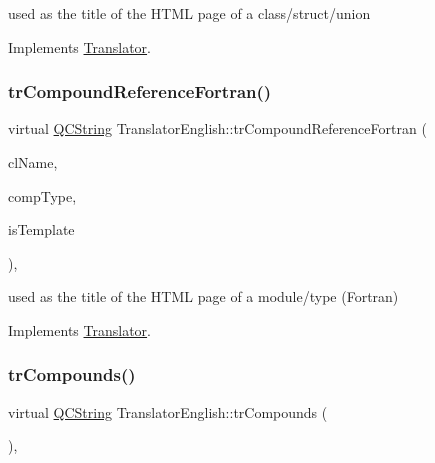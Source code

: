 used as the title of the H\+T\+ML page of a class/struct/union 

Implements \mbox{\hyperlink{class_translator}{Translator}}.

\mbox{\label{class_translator_english_a2f3045ecf95c13d25874ae6ea35d574e}} 
\subsubsection{\texorpdfstring{trCompoundReferenceFortran()}{trCompoundReferenceFortran()}}
{\footnotesize\ttfamily virtual \mbox{\hyperlink{class_q_c_string}{Q\+C\+String}} Translator\+English\+::tr\+Compound\+Reference\+Fortran (\begin{DoxyParamCaption}\item[{const char $\ast$}]{cl\+Name,  }\item[{\mbox{\hyperlink{class_class_def_ae70cf86d35fe954a94c566fbcfc87939}{Class\+Def\+::\+Compound\+Type}}}]{comp\+Type,  }\item[{bool}]{is\+Template }\end{DoxyParamCaption})\hspace{0.3cm}{\ttfamily [inline]}, {\ttfamily [virtual]}}

used as the title of the H\+T\+ML page of a module/type (Fortran) 

Implements \mbox{\hyperlink{class_translator}{Translator}}.

\mbox{\label{class_translator_english_a76661b103a0cb78c0bcf26d4b3941d7a}} 
\subsubsection{\texorpdfstring{trCompounds()}{trCompounds()}}
{\footnotesize\ttfamily virtual \mbox{\hyperlink{class_q_c_string}{Q\+C\+String}} Translator\+English\+::tr\+Compounds (\begin{DoxyParamCaption}{ }\end{DoxyParamCaption})\hspace{0.3cm}{\ttfamily [inline]}, {\ttfamily [virtual]}}

